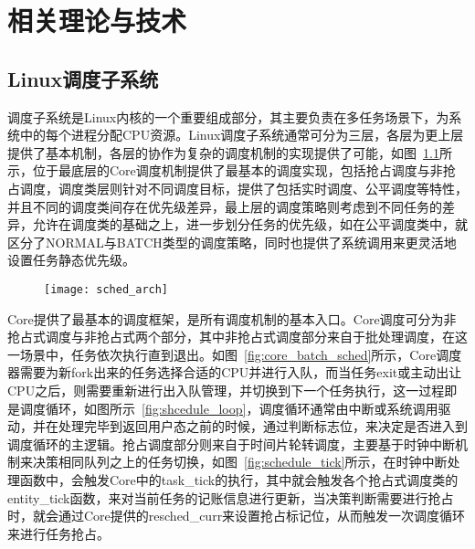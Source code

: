 \chapter{相关理论与技术}\label{chap:theories_tech}

\section{Linux调度子系统}


调度子系统是Linux内核的一个重要组成部分，其主要负责在多任务场景下，为系统中的每个进程分配CPU资源。Linux调度子系统通常可分为三层，各层为更上层提供了基本机制，各层的协作为复杂的调度机制的实现提供了可能，如图~\ref{fig:sched_arch}所示，位于最底层的Core调度机制提供了最基本的调度实现，包括抢占调度与非抢占调度，调度类层则针对不同调度目标，提供了包括实时调度、公平调度等特性，并且不同的调度类间存在优先级差异，最上层的调度策略则考虑到不同任务的差异，允许在调度类的基础之上，进一步划分任务的优先级，如在公平调度类中，就区分了NORMAL与BATCH类型的调度策略，同时也提供了系统调用来更灵活地设置任务静态优先级。

\begin{figure}[!htbp]
    \centering
    \texttt{[image: sched\_arch]}
    \label{fig:sched_arch}
\end{figure}

Core提供了最基本的调度框架，是所有调度机制的基本入口。Core调度可分为非抢占式调度与非抢占式两个部分，其中非抢占式调度部分来自于批处理调度，在这一场景中，任务依次执行直到退出。如图~\ref{fig:core_batch_sched}所示，Core调度器需要为新fork出来的任务选择合适的CPU并进行入队，而当任务exit或主动出让CPU之后，则需要重新进行出入队管理，并切换到下一个任务执行，这一过程即是调度循环，如图所示~\ref{fig:shcedule_loop}，调度循环通常由中断或系统调用驱动，并在处理完毕到返回用户态之前的时候，通过判断标志位，来决定是否进入到调度循环的主逻辑。抢占调度部分则来自于时间片轮转调度，主要基于时钟中断机制来决策相同队列之上的任务切换，如图~\ref{fig:schedule_tick}所示，在时钟中断处理函数中，会触发Core中的task\_tick的执行，其中就会触发各个抢占式调度类的entity\_tick函数，来对当前任务的记账信息进行更新，当决策判断需要进行抢占时，就会通过Core提供的resched\_curr来设置抢占标记位，从而触发一次调度循环来进行任务抢占。

